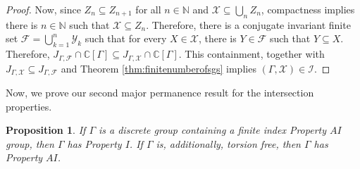 \documentclass[a4paper, 12pt]{amsart}
\newtheorem{prp}[thm]{Proposition}
\theoremstyle{definition}
\theoremstyle{remark}
\numberwithin{equation}{section}
\begin{document}
\begin{proof}
    Now, since $Z_{n}\subseteq Z_{n+1}$ for all $n\in\mathbb{N}$ and $\mathcal{X}\subseteq \bigcup_{n}Z_{n}$, compactness implies there is $n\in\mathbb{N}$ such that $\mathcal{X}\subseteq Z_{n}$. Therefore, there is a conjugate invariant finite set $\mathcal{F} = \bigcup^{n}_{k=1}\mathcal{Y}_{k}$ such that for every $X\in\mathcal{X}$, there is $Y\in\mathcal{F}$ such that $Y\subseteq X$. Therefore, $J_{\Gamma,\mathcal{F}}\cap \mathbb{C}[\Gamma]\subseteq J_{\Gamma, \mathcal{X}}\cap\mathbb{C}[\Gamma]$. This containment, together with $J_{\Gamma, \mathcal{X}}\subseteq J_{\Gamma,\mathcal{F}}$ and Theorem \ref{thm:finitenumberofsgs} implies $(\Gamma,\mathcal{X})\in\mathcal{I}$.
\end{proof}

Now, we prove our second major permanence result for the intersection properties.

\begin{prp}
\label{prp:finiteindexext}
    If $\Gamma$ is a discrete group containing a finite index Property $AI$ group, then $\Gamma$ has Property $I$. If $\Gamma$ is, additionally, torsion free, then $\Gamma$ has Property $AI$.
\end{prp}
\end{document}
